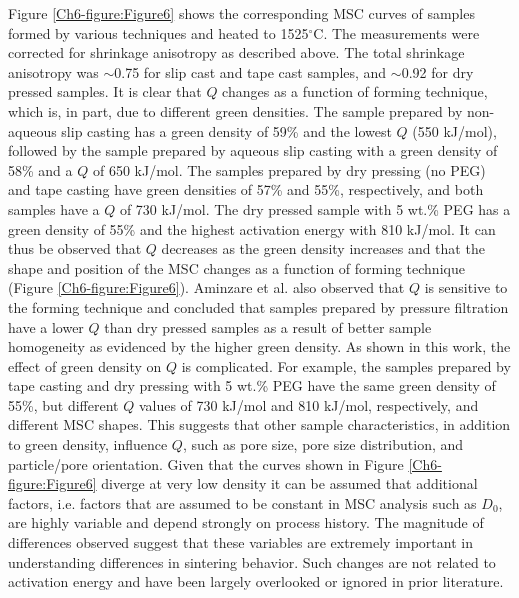 Figure \ref{Ch6-figure:Figure6} shows the corresponding MSC curves of samples formed by various techniques and heated to 1525$^{\circ}$C. The measurements were corrected for shrinkage anisotropy as described above. The total shrinkage anisotropy was $\sim$0.75 for slip cast and tape cast samples, and $\sim$0.92 for dry pressed samples. It is clear that $Q$ changes as a function of forming technique, which is, in part, due to different green densities. The sample prepared by non-aqueous slip casting has a green density of 59\% and the lowest $Q$ (550 kJ/mol), followed by the sample prepared by aqueous slip casting with a green density of 58\% and a $Q$ of 650 kJ/mol. The samples prepared by dry pressing (no PEG) and tape casting have green densities of 57\% and 55\%, respectively, and both samples have a $Q$ of 730 kJ/mol. The dry pressed sample with 5 wt.\% PEG has a green density of 55\% and the highest activation energy with 810 kJ/mol. It can thus be observed that $Q$ decreases as the green density increases and that the shape and position of the MSC changes as a function of forming technique (Figure \ref{Ch6-figure:Figure6}). Aminzare et al. \cite{Aminzare2010} also observed that $Q$ is sensitive to the forming technique and concluded that samples prepared by pressure filtration have a lower $Q$ than dry pressed samples as a result of better sample homogeneity as evidenced by the higher green density. As shown in this work, the effect of green density on $Q$ is complicated. For example, the samples prepared by tape casting and dry pressing with 5 wt.\% PEG have the same green density of 55\%, but different $Q$ values of 730 kJ/mol and 810 kJ/mol, respectively, and different MSC shapes. This suggests that other sample characteristics, in addition to green density, influence $Q$, such as pore size, pore size distribution, and particle/pore orientation. Given that the curves shown in Figure \ref{Ch6-figure:Figure6} diverge at very low density it can be assumed that additional factors, i.e. factors that are assumed to be constant in MSC analysis such as $D_{0}$, are highly variable and depend strongly on process history. The magnitude of differences observed suggest that these variables are extremely important in understanding differences in sintering behavior. Such changes are not related to activation energy and have been largely overlooked or ignored in prior literature.

